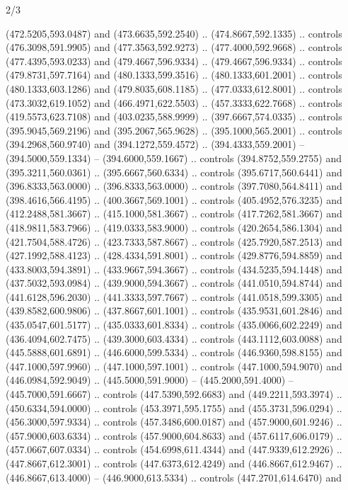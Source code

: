 \begin{flagdescription}{2/3}
\begin{scope}[xshift=0.5\flaglength,yshift=0.5\flagwidth,scale=\flagwidth/525.28]
\begin{scope}[y=0.1mm, x=0.1mm, yscale=-1,shift={(-381.5,-404)}]
\begin{scope}[shift={(5.25001,4.53053)},miter limit=4.00,line width=0.800\lw]
  (472.5205,593.0487) and (473.6635,592.2540) .. (474.8667,592.1335) .. controls
  (476.3098,591.9905) and (477.3563,592.9273) .. (477.4000,592.9668) .. controls
  (477.4395,593.0233) and (479.4667,596.9334) .. (479.4667,596.9334) .. controls
  (479.8731,597.7164) and (480.1333,599.3516) .. (480.1333,601.2001) .. controls
  (480.1333,603.1286) and (479.8035,608.1185) .. (477.0333,612.8001) .. controls
  (473.3032,619.1052) and (466.4971,622.5503) .. (457.3333,622.7668) .. controls
  (419.5573,623.7108) and (403.0235,588.9999) .. (397.6667,574.0335) .. controls
  (395.9045,569.2196) and (395.2067,565.9628) .. (395.1000,565.2001) .. controls
  (394.2968,560.9740) and (394.1272,559.4572) .. (394.4333,559.2001) --
  (394.5000,559.1334) -- (394.6000,559.1667) .. controls (394.8752,559.2755) and
  (395.3211,560.0361) .. (395.6667,560.6334) .. controls (395.6717,560.6441) and
  (396.8333,563.0000) .. (396.8333,563.0000) .. controls (397.7080,564.8411) and
  (398.4616,566.4195) .. (400.3667,569.1001) .. controls (405.4952,576.3235) and
  (412.2488,581.3667) .. (415.1000,581.3667) .. controls (417.7262,581.3667) and
  (418.9811,583.7966) .. (419.0333,583.9000) .. controls (420.2654,586.1304) and
  (421.7504,588.4726) .. (423.7333,587.8667) .. controls (425.7920,587.2513) and
  (427.1992,588.4123) .. (428.4334,591.8001) .. controls (429.8776,594.8859) and
  (433.8003,594.3891) .. (433.9667,594.3667) .. controls (434.5235,594.1448) and
  (437.5032,593.0984) .. (439.9000,594.3667) .. controls (441.0510,594.8744) and
  (441.6128,596.2030) .. (441.3333,597.7667) .. controls (441.0518,599.3305) and
  (439.8582,600.9806) .. (437.8667,601.1001) .. controls (435.9531,601.2846) and
  (435.0547,601.5177) .. (435.0333,601.8334) .. controls (435.0066,602.2249) and
  (436.4094,602.7475) .. (439.3000,603.4334) .. controls (443.1112,603.0088) and
  (445.5888,601.6891) .. (446.6000,599.5334) .. controls (446.9360,598.8155) and
  (447.1000,597.9960) .. (447.1000,597.1001) .. controls (447.1000,594.9070) and
  (446.0984,592.9049) .. (445.5000,591.9000) -- (445.2000,591.4000) --
  (445.7000,591.6667) .. controls (447.5390,592.6683) and (449.2211,593.3974) ..
  (450.6334,594.0000) .. controls (453.3971,595.1755) and (455.3731,596.0294) ..
  (456.3000,597.9334) .. controls (457.3486,600.0187) and (457.9000,601.9246) ..
  (457.9000,603.6334) .. controls (457.9000,604.8633) and (457.6117,606.0179) ..
  (457.0667,607.0334) .. controls (454.6998,611.4344) and (447.9339,612.2926) ..
  (447.8667,612.3001) .. controls (447.6373,612.4249) and (446.8667,612.9467) ..
  (446.8667,613.4000) -- (446.9000,613.5334) .. controls (447.2701,614.6470) and

\end{scope}
\end{scope}
\end{scope}
\end{flagdescription}
